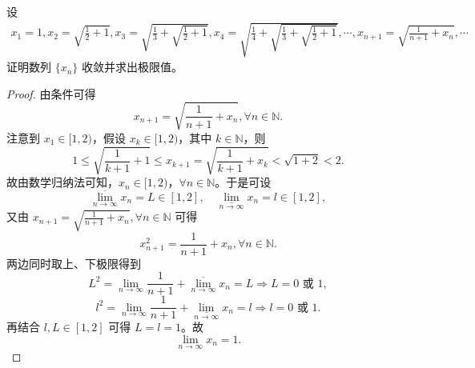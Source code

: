 \documentclass[lang=cn,newtx,10pt,scheme=chinese]{../Template/elegantbook}
\begin{document}
\begin{example}
设
\begin{align*}
x_1 = 1, 
x_2 = \sqrt{\frac{1}{2} + 1}, 
x_3 = \sqrt{\frac{1}{3} + \sqrt{\frac{1}{2} + 1}}, 
x_4 = \sqrt{\frac{1}{4} + \sqrt{\frac{1}{3} + \sqrt{\frac{1}{2} + 1}}}, 
\cdots ,
x_{n+1} = \sqrt{\frac{1}{n+ 1}  + x_n}, \cdots
\end{align*}
证明数列 $\{x_n\}$ 收敛并求出极限值。
\end{example}
\begin{proof}
由条件可得  
\[
x_{n+1}=\sqrt{\frac{1}{n+1}+x_n},\forall n\in \mathbb{N}.
\]
注意到 $x_1\in [1,2)$，假设 $x_k\in [1,2)$，其中 $k\in \mathbb{N}$，则  
\[
1\leqslant \sqrt{\frac{1}{k+1}+1}\leqslant x_{k+1}=\sqrt{\frac{1}{k+1}+x_k}<\sqrt{1+2}<2.
\]
故由数学归纳法可知，$x_n\in [1,2)$，$\forall n\in \mathbb{N}$。于是可设  
\[
\underset{n\rightarrow \infty}{\overline{\lim }}x_n=L\in [1,2],\quad \underset{n\rightarrow \infty}{\underline{\lim }}x_n=l\in [1,2],
\]
又由 $x_{n+1}=\sqrt{\frac{1}{n+1}+x_n},\forall n\in \mathbb{N}$ 可得  
\[
x_{n+1}^{2}=\frac{1}{n+1}+x_n,\forall n\in \mathbb{N}.
\]
两边同时取上、下极限得到  
\[
L^2=\underset{n\rightarrow \infty}{\lim}\frac{1}{n+1}+\underset{n\rightarrow \infty}{\overline{\lim }}x_n=L\Rightarrow L=0\text{ 或 }1,
\]
\[
l^2=\underset{n\rightarrow \infty}{\lim}\frac{1}{n+1}+\underset{n\rightarrow \infty}{\underline{\lim }}x_n=l\Rightarrow l=0\text{ 或 }1.
\]
再结合 $l,L\in [1,2]$ 可得 $L=l=1$。故  
\[
\underset{n\rightarrow \infty}{\lim}x_n=1.
\]

\end{proof}
\end{document}
